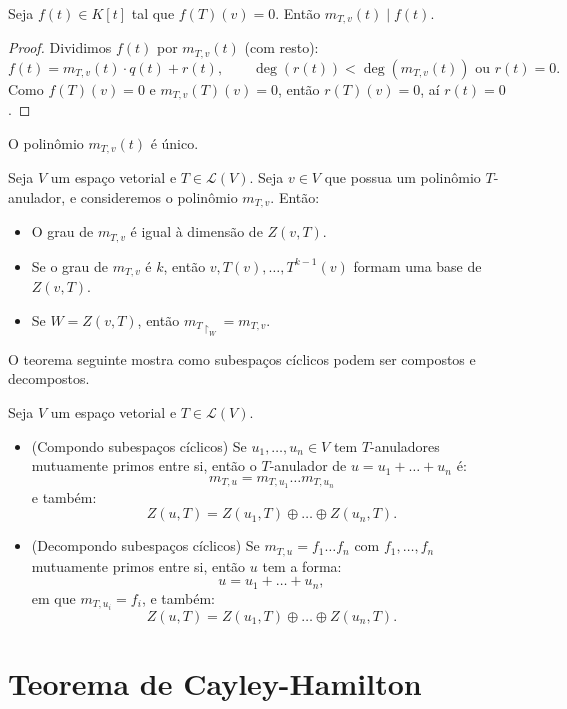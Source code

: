 \documentclass[11pt,twoside,a4paper]{book}
\begin{document}
\begin{lema}
Seja $f(t)\in K[t]$ tal que $f(T)(v)=0$. Então $m_{T,v}(t)\mid f(t)$.
\end{lema}
\begin{proof}
Dividimos $f(t)$ por $m_{T,v}(t)$ (com resto):
\[
f(t)=m_{T,v}(t)\cdot q(t)+r(t),\quad\quad\deg(r(t))<\deg(m_{T,v}(t))\text{ ou }r(t)=0.
\]
Como $f(T)(v)=0$ e $m_{T,v}(T)(v)=0$, então $r(T)(v)=0$, aí $r(t)=0$.
\end{proof}

\begin{corolario}
O polinômio $m_{T,v}(t)$ é único.
\end{corolario}

\begin{teorema}
Seja $V$ um espaço vetorial e $T\in\mathcal{L}(V)$. Seja $v\in V$ que possua um polinômio $T$-anulador, e consideremos o polinômio $m_{T,v}$. Então:
\begin{itemize}
\item O grau de $m_{T,v}$ é igual à dimensão de $Z(v,T)$.
\item Se o grau de $m_{T,v}$ é $k$, então $v,T(v),\dots,T^{k-1}(v)$ formam uma base de $Z(v,T)$.
\item Se $W=Z(v,T)$, então $m_{T\upharpoonright_W}=m_{T,v}$.
\end{itemize}
\end{teorema}

\noindent
O teorema seguinte mostra como subespaços cíclicos podem ser compostos e decompostos.

\begin{teorema}\label{ciclico}
Seja $V$ um espaço vetorial e $T\in\mathcal{L}(V)$.
\begin{itemize}
\item (Compondo subespaços cíclicos) Se $u_1,\dots,u_n\in V$ tem $T$-anuladores mutuamente primos entre si, então o $T$-anulador de $u=u_1+\dots+u_n$ é:
\[
m_{T,u}=m_{T,u_1}\dots m_{T,u_n}
\]
e também:
\[
Z(u,T)=Z(u_1,T)\oplus\dots\oplus Z(u_n,T).
\]
\item (Decompondo subespaços cíclicos) Se $m_{T,u}=f_1\dots f_n$ com $f_1,\dots,f_n$ mutuamente primos entre si, então $u$ tem a forma:
\[
u=u_1+\dots+u_n,
\]
em que $m_{T,u_i}=f_i$, e também:
\[
Z(u,T)=Z(u_1,T)\oplus\dots\oplus Z(u_n,T).
\]
\end{itemize}
\end{teorema}

\section{Teorema de Cayley-Hamilton}
\end{document}
